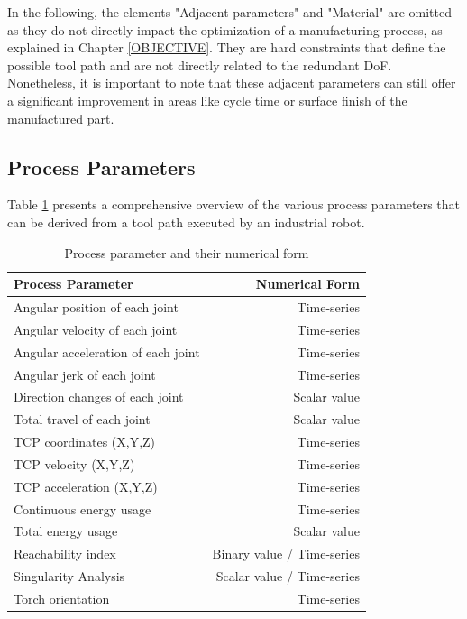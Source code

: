 In the following, the elements "Adjacent parameters" and "Material" are omitted as they do not directly impact the optimization of a manufacturing process, as explained in Chapter \ref{OBJECTIVE}. They are hard constraints that define the possible tool path and are not directly related to the redundant DoF. Nonetheless, it is important to note that these adjacent parameters can still offer a significant improvement in areas like cycle time or surface finish of the manufactured part.

\newpage
\subsection{Process Parameters}\label{pp}


Table \ref{procesparameters} presents a comprehensive overview of the various process parameters that can be derived from a tool path executed by an industrial robot. 


\begin{table}[H]
	\centering
	\begin{tabular}{||l|r||}
		\hline
		Process Parameter & Numerical Form\\
		\hline
		\hline
		\hline
		Angular position of each joint & Time-series\\
		Angular velocity of each joint & Time-series\\
		Angular acceleration of each joint& Time-series\\
		Angular jerk of each joint& Time-series\\
		\hline
		\hline
		Direction changes of each joint& Scalar value\\
		Total travel of each joint& Scalar value\\
		\hline
		\hline	
		
		TCP coordinates (X,Y,Z) & Time-series\\
		TCP velocity (X,Y,Z) & Time-series\\
		TCP acceleration (X,Y,Z) & Time-series\\
		
		
		\hline
		\hline
		Continuous energy usage & Time-series\\
		Total energy usage & Scalar value\\
		\hline
		\hline
		Reachability index & Binary value / Time-series\\
		Singularity Analysis & Scalar value / Time-series\\
		Torch orientation & Time-series\\
		
		
		\hline
		\hline
		
	\end{tabular}
	
	
	\caption{Process parameter and their numerical form}
	\label{procesparameters}
\end{table}

